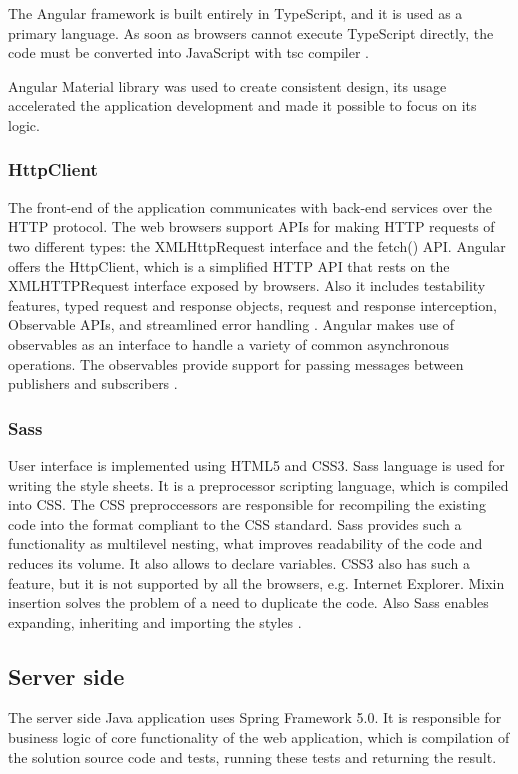 The Angular framework is built entirely in TypeScript, and it is used as a primary language. As soon as browsers cannot execute TypeScript directly, the code must be converted into JavaScript with tsc compiler \cite[TypeScript Configuration]{angular}.

Angular Material library was used to create consistent design, its usage accelerated the application development and made it possible to focus on its logic.

\subsubsection{HttpClient}
The front-end of the application communicates with back-end services over the HTTP protocol. The web browsers support APIs for making HTTP requests of two different types: the XMLHttpRequest interface and the fetch() API. Angular offers the HttpClient, which is a simplified HTTP API that rests on the XMLHTTPRequest interface exposed by browsers. Also it includes testability features, typed request and response objects, request and response interception, Observable APIs, and streamlined error handling \cite[HttpClient]{angular}. Angular makes use of observables as an interface to handle a variety of common asynchronous operations. The observables provide support for passing messages between publishers and subscribers \cite[Observables \& RxJS]{angular}. 

\subsubsection{Sass}
User interface is implemented using HTML5 and CSS3. Sass language is used for writing the style sheets. It is a preprocessor scripting language, which is compiled into CSS. The CSS preproccessors are responsible for recompiling the existing code into the format compliant to the CSS standard. Sass provides such a functionality as multilevel nesting, what improves readability of the code and reduces its volume. It also allows to declare variables. CSS3 also has such a feature, but it is not supported by all the browsers, e.g. Internet Explorer. Mixin insertion solves the problem of a need to duplicate the code. Also Sass enables expanding, inheriting and importing the styles \cite{sass}.

\subsection{Server side}
The server side Java application uses Spring Framework 5.0. It is responsible for business logic of core functionality of the web application, which is compilation of the solution source code and tests, running these tests and returning the result.


